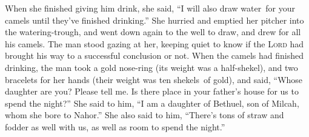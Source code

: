 \begin{inparaenum}
     When she finished giving him drink, she said, ``I will also draw water\understood\ for your camels until they've finished drinking.''%
     She hurried and emptied her pitcher into the watering-trough, and went down again to the well to draw, and drew for all his camels.%
     The man stood gazing at her, keeping quiet to know if the \textsc{Lord} had brought his way to a successful conclusion or not.%
     When the camels had finished drinking, the man took a gold nose-ring (its weight was a half-shekel), and two bracelets for her hands (their weight was ten shekels\understood\ of gold),%
     and said, ``Whose daughter are you? Please tell me. Is there place in your father's house for us to spend the night?''%
     She said to him, ``I am a daughter of Bethuel, son of Milcah, whom she bore to Nahor.''%
     She also said to him, ``There's tons of straw and fodder as well with us, as well as room to spend the night.''%
    
    
     \smallskip%
    
    \pvdb{}{}%
    
    \pvdb{}{}%
    
\end{inparaenum}
